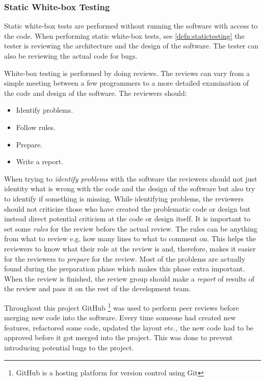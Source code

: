 \documentclass[../../master.tex]{subfiles}
\begin{document}
\subsubsection{Static White-box Testing} \label{staticwhitebox}
Static white-box tests are performed without running the software with access to the code.
When performing static white-box tests, see \cref{defn:statictesting} the tester is reviewing the architecture and the design of the software.
The tester can also be reviewing the actual code for bugs. \cite{SoftwareTesting}

White-box testing is performed by doing reviews.
The reviews can vary from a simple meeting between a few programmers to a more detailed examination of the code and design of the software.
The reviewers should: \cite{SoftwareTesting}

\begin{itemize}
	\item Identify problems.
	\item Follow rules.
	\item Prepare.
	\item Write a report.
\end{itemize}

When trying to \textit{identify problems} with the software the reviewers should not just identity what is wrong with the code and the design of the software but also try to identify if something is missing.
While identifying problems, the reviewers should not criticize those who have created the problematic code or design but instead direct potential criticism at the code or design itself.
It is important to set some \textit{rules} for the review before the actual review.
The rules can be anything from what to review e.g. how many lines to what to comment on.
This helps the reviewers to know what their role at the review is and, therefore, makes it easier for the reviewers to \textit{prepare} for the review.
Most of the problems are actually found during the preparation phase which makes this phase extra important.
When the review is finished, the review group should make a \textit{report} of results of the review and pass it on the rest of the development team. \cite{SoftwareTesting}

Throughout this project GitHub \footnote{GitHub is a hosting platform for version control using Git} was used to perform peer reviews before merging new code into the software.
Every time someone had created new features, refactored some code, updated the layout etc., the new code had to be approved before it got merged into the project.
This was done to prevent introducing potential bugs to the project.
\end{document}
